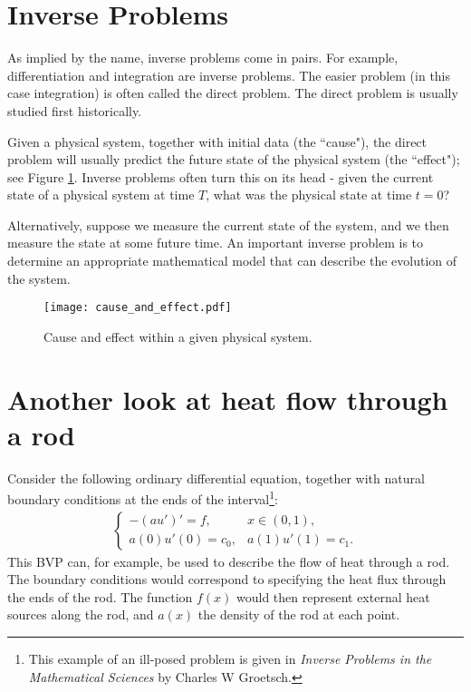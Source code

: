 \section*{Inverse Problems}
As implied by the name, inverse problems come in pairs.
For example, differentiation and integration are inverse problems.
The easier problem (in this case integration) is often called the direct problem.
The direct problem is usually studied first historically.

Given a physical system, together with initial data (the ``cause"), the direct problem will usually predict the future state of the physical system (the ``effect"); see Figure \ref{fig:cause_and_effect}.
Inverse problems often turn this on its head - given the current state of a physical system at time $T$, what was the physical state at time $t = 0$?  

Alternatively, suppose we measure the current state of the system, and we then measure the state at some future time.
An important inverse problem is to determine an appropriate mathematical model that can describe the evolution of the system.

\begin{figure}
\centering
\texttt{[image: cause\_and\_effect.pdf]}
\caption{Cause and effect within a given physical system.}
\label{fig:cause_and_effect}
\end{figure}

\section*{Another look at heat flow through a rod}
Consider the following ordinary differential equation, together with natural boundary conditions at the ends of the interval\footnote{This example of an ill-posed problem is given in \textit{Inverse Problems in the Mathematical Sciences} by Charles W Groetsch.}:
\begin{align}
\begin{cases}
	-(au')' = f, & x \in (0,1),\\
	a(0)u'(0) = c_0, & a(1)u'(1) = c_1.
\end{cases} \label{inverse_problems:heat_flow}
\end{align}
This BVP can, for example, be used to describe the flow of heat through a rod.
The boundary conditions would correspond to specifying the heat flux through the ends of the rod.
The function $f(x)$ would then represent external heat sources along the rod, and $a(x)$ the density of the rod at each point. 

